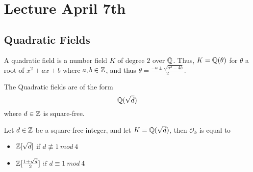\section{Lecture April 7th}

\subsection{Quadratic Fields}

\begin{definition}
A quadratic field is a number field $K$ of degree $2$ over $\mathbb{Q}$. Thus, $K = \mathbb{Q}(\theta)$ for $\theta$ a root of $x^2 + ax + b$ where $a, b \in \mathbb{Z}$, and thus $\theta = \frac{-a \pm \sqrt{a^2 - 4b}}{2}$.
\end{definition}

\begin{proposition}
The Quadratic fields are of the form
\[\mathbb{Q}(\sqrt{d})\]
where $d \in \mathbb{Z}$ is square-free.
\end{proposition}

\begin{theorem}[pg. 64 of ST]
Let $d \in \mathbb{Z}$ be a square-free integer, and let $K = \mathbb{Q}(\sqrt{d})$, then $\mathcal{O}_k$ is equal to
\begin{itemize}
    \item $\mathbb{Z}[\sqrt{d}]$ if $d \not \equiv 1\ mod\ 4$
    \item $\mathbb{Z}[\frac{1 + \sqrt{d}}{2}]$ if $d \equiv 1\ mod\ 4$
\end{itemize}
\end{theorem}

